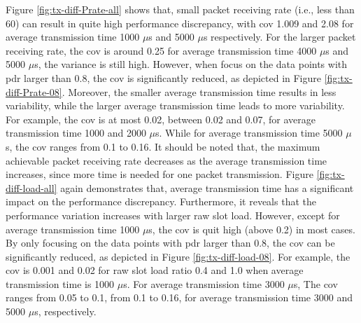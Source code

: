 Figure \ref{fig:tx-diff-Prate-all} shows that, small packet receiving rate (i.e., less than 60) can result in quite high performance discrepancy, with \gls{cov} 1.009 and 2.08 for average transmission time 1000 $\mu$s and 5000 $\mu$s respectively. For the larger packet receiving rate, the \gls{cov} is around 0.25 for average transmission time 4000 $\mu$s and 5000 $\mu$s, the variance is still high. However, when focus on the data points with \gls{pdr} larger than 0.8, the \gls{cov} is significantly reduced, as depicted in Figure \ref{fig:tx-diff-Prate-08}. Moreover, the smaller average transmission time results in less variability, while the larger average transmission time leads to more variability. For example, the \gls{cov} is at most 0.02, between 0.02 and 0.07, for average transmission time 1000 and 2000 $\mu$s. While for average transmission time 5000 $\mu$s, the \gls{cov} ranges from 0.1 to 0.16. It should be noted that, the maximum achievable packet receiving rate decreases as the average transmission time increases, since more time is needed for one packet transmission.
Figure \ref{fig:tx-diff-load-all} again demonstrates that, average transmission time has a significant impact on the performance discrepancy. Furthermore, it reveals that the performance variation increases with larger \gls{raw} slot load. However, except for average transmission time 1000 $\mu$s, the \gls{cov} is quit high (above 0.2) in most cases. By only focusing on the data points with \gls{pdr} larger than 0.8, the \gls{cov} can be significantly reduced, as depicted in Figure \ref{fig:tx-diff-load-08}.
For example, the \gls{cov} is 0.001 and 0.02 for \gls{raw} slot load ratio 0.4 and 1.0 when average transmission time is 1000 $\mu$s. For average transmission time 3000 $\mu$s, The \gls{cov} ranges from 0.05 to 0.1,  from 0.1 to 0.16, for  average transmission time 3000 and 5000  $\mu$s, respectively. 



